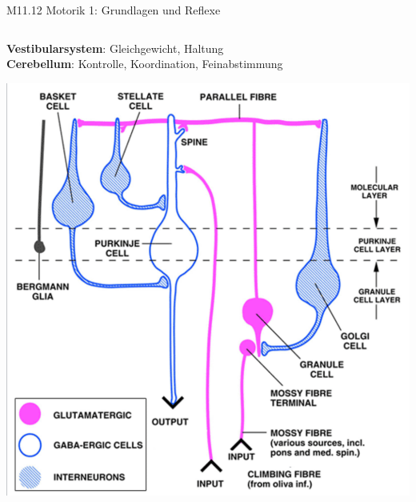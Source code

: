 \documentclass{beamer}
\begin{document}
\begin{frame}{M11.12 Motorik 1: Grundlagen und Reflexe}
\begin{columns}[c]
\begin{column}{5cm}
\textbf{Vestibularsystem}: Gleichgewicht, Haltung  \\


\textbf{Cerebellum}: Kontrolle, Koordination, Feinabstimmung \\

\pause

\begin{center}
    \includegraphics[width=\textwidth]{cerebellum_layers.png}
\end{center}

\end{column}


\end{columns}


\end{frame}
\end{document}
